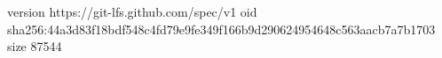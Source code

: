 version https://git-lfs.github.com/spec/v1
oid sha256:44a3d83f18bdf548c4fd79e9fe349f166b9d290624954648c563aacb7a7b1703
size 87544
